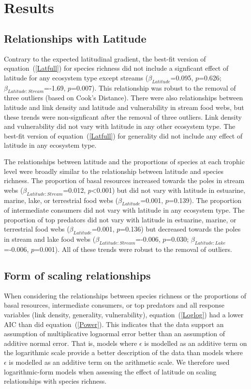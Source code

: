 \documentclass[12pt]{article}
\begin{document}
\section*{Results}

\subsection*{Relationships with Latitude}

  Contrary to the expected latitudinal gradient, the best-fit version of
  equation~(\ref{Latfull}) for species richness did not include a signficant effect of latitude for any ecosystem type except streams
  ($\beta_{Latitude}$=0.095, $p$=0.626; $\beta_{Latitude:Stream}$=-1.69, $p$=0.007).  This
  relationship was robust to the removal of three outliers (based on Cook's Distance). 
  There were also relationships between latitude and link density and latitude and vulnerability
  in stream food webs, but these trends were non-signficant after the removal of three outliers.
  Link density and vulnerability did not vary with latitude in any other ecosystem type.
  The best-fit version of equation~(\ref{Latfull}) for generality did not include any effect of
  latitude in any ecosystem type. 


  The relationships between latitude and the proportions of species at each trophic level were broadly similar
  to the relationship between latitude and species richness. 
  The proportion of basal resources increased towards the poles in stream webs ($\beta_{Latitude:Stream}$=0.012, $p$\textless0.001) 
  but did not vary with latitude in estuarine, marine, lake, or terrestrial 
  food webs ($\beta_{Latitude}$=0.001, $p$=0.139).
  The proportion of intermediate consumers did not vary with latitude in any ecosystem type.
  The proportion of top predators did not vary with latitude in 
  estuarine, marine, or terrestrial food webs ($\beta_{Latitude}$=0.001, $p$=0.136) but decreased towards the poles in stream and lake food 
  webs ($\beta_{Latitude:Stream}$=-0.006, $p$=0.030; 
  $\beta_{Latitude:Lake}$=-0.006, $p$=0.001). 
  All of these trends were robust to the removal of outliers.


\subsection*{Form of scaling relationships}

  When considering the relationships between species richness or the proportions 
  of basal resources, intermediate consumers, or top predators and all response variables 
  (link density, generality, vulnerability), equation~(\ref{Loglog}) had a
  lower AIC than did equation~(\ref{Power}). This indicates that the
  data support an assumption of multiplicative lognormal error better than an
  assumption of additive normal error. That is, models where $\epsilon$ is
  modelled as an additive term on
  the logarithmic scale provide a better description of the data than models
  where $\epsilon$ is modelled as an additive term on the arithmetic scale.  
  We therefore used logarithmic-form models when assessing the
  effect of latitude on scaling relationships  with species richness.
\end{document}
